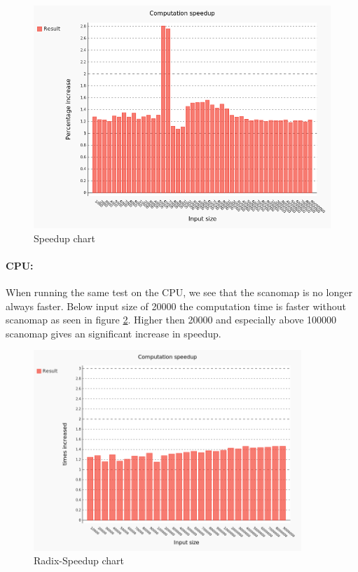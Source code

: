\documentclass[11pt]{article}
\begin{document}
\begin{figure}[hb]
  \centering
    \includegraphics[width=1.0\textwidth]{images/comparing.png}
  \caption{Speedup chart}
  \label{fig:map-scan fusion speedup}
\end{figure}

\paragraph*{CPU:} When running the same test on the CPU, we see that the scanomap is no longer always faster. Below input size of 20000 the computation time is faster without scanomap as seen in figure \ref{fig:CPU-map-scan fusion speedup}. Higher then 20000 and especially above 100000 scanomap gives an significant increase in speedup.

\begin{figure}[hb]
  \centering
    \includegraphics[width=0.9\textwidth]{images/radix-comparing.png}
  \caption{Radix-Speedup chart}
  \label{fig:CPU-map-scan fusion speedup}
\end{figure}
\end{document}
